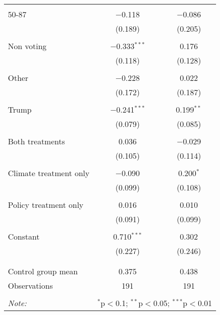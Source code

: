 \begin{tabular}{@{\extracolsep{5pt}}lcc}
  & & \\ 
 50-87 & $-$0.118 & $-$0.086 \\ 
  & (0.189) & (0.205) \\ 
  & & \\ 
 Non voting & $-$0.333$^{***}$ & 0.176 \\ 
  & (0.118) & (0.128) \\ 
  & & \\ 
 Other & $-$0.228 & 0.022 \\ 
  & (0.172) & (0.187) \\ 
  & & \\ 
 Trump & $-$0.241$^{***}$ & 0.199$^{**}$ \\ 
  & (0.079) & (0.085) \\ 
  & & \\ 
 Both treatments & 0.036 & $-$0.029 \\ 
  & (0.105) & (0.114) \\ 
  & & \\ 
 Climate treatment only & $-$0.090 & 0.200$^{*}$ \\ 
  & (0.099) & (0.108) \\ 
  & & \\ 
 Policy treatment only & 0.016 & 0.010 \\ 
  & (0.091) & (0.099) \\ 
  & & \\ 
 Constant & 0.710$^{***}$ & 0.302 \\ 
  & (0.227) & (0.246) \\ 
  & & \\ 
\hline \\[-1.8ex] 
Control group mean & 0.375 & 0.438 \\ 
Observations & 191 & 191 \\ 
\hline 
\hline \\[-1.8ex] 
\textit{Note:}  & \multicolumn{2}{r}{$^{*}$p$<$0.1; $^{**}$p$<$0.05; $^{***}$p$<$0.01} \\ 
\end{tabular} 
